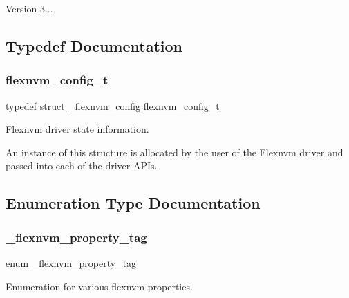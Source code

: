 Version 3... 

\subsection{Typedef Documentation}
\mbox{\label{group__ftfx__flexnvm__driver_ga8fd4d473c0a4b30cac163160fb28a6c1}} 
\subsubsection{\texorpdfstring{flexnvm\_config\_t}{flexnvm\_config\_t}}
{\footnotesize\ttfamily typedef struct \mbox{\hyperlink{struct__flexnvm__config}{\+\_\+flexnvm\+\_\+config}}  \mbox{\hyperlink{group__ftfx__flexnvm__driver_ga8fd4d473c0a4b30cac163160fb28a6c1}{flexnvm\+\_\+config\+\_\+t}}}



Flexnvm driver state information. 

An instance of this structure is allocated by the user of the Flexnvm driver and passed into each of the driver A\+P\+Is. 

\subsection{Enumeration Type Documentation}
\mbox{\label{group__ftfx__flexnvm__driver_ga562d369144a5774490de42bfdd66c17b}} 
\subsubsection{\texorpdfstring{\_flexnvm\_property\_tag}{\_flexnvm\_property\_tag}}
{\footnotesize\ttfamily enum \mbox{\hyperlink{group__ftfx__flexnvm__driver_ga562d369144a5774490de42bfdd66c17b}{\+\_\+flexnvm\+\_\+property\+\_\+tag}}}



Enumeration for various flexnvm properties. 

